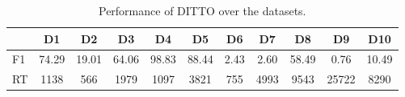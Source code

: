 \begin{table}[t]
\footnotesize
\centering
\setlength{\tabcolsep}{1.4pt}
\caption{Performance of DITTO over the datasets.}
\vspace{-10pt}
\label{tab:zeroer-results}
\begin{tabular}{|l|c|c|c|c|c|c|c|c|c|c|}
\cline{2-11}
\multicolumn{1}{c|}{} & D1 & D2 & D3 & D4 & D5 & D6 & D7 & D8 & D9 & D10 \\
\hline
\hline
F1 & 74.29 & 19.01 & 64.06 & 98.83 & 88.44 & 2.43 & 2.60 & 58.49 & 0.76 & 10.49 \\
RT & 1138 & 566 & 1979 & 1097 & 3821 & 755 & 4993 & 9543 & 25722 & 8290 \\
\hline
\end{tabular}
\vspace{-8pt}
\end{table}